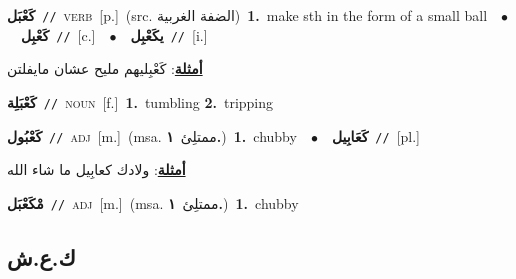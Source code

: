 \documentclass[10pt,a4paper,twoside]{article} %
\begin{document}
\begin{multicols}{2}
{\setlength\topsep{0pt}\textbf{\foreignlanguage{arabic}{كَعْبَل}}\ {\color{gray}\texttt{//}\color{black}}\ \textsc{verb}\ [p.]\ (src. \color{gray}\foreignlanguage{arabic}{الضفة الغربية}\color{black})\ \textbf{1.}~make sth in the form of a small ball\ \ $\bullet$\ \ \setlength\topsep{0pt}\textbf{\foreignlanguage{arabic}{كَعْبِل}}\ {\color{gray}\texttt{//}\color{black}}\ [c.]\ \ $\bullet$\ \ \setlength\topsep{0pt}\textbf{\foreignlanguage{arabic}{يكَعْبِل}}\ {\color{gray}\texttt{//}\color{black}}\ [i.]\  \begin{flushright}\color{gray}\foreignlanguage{arabic}{\textbf{\underline{\foreignlanguage{arabic}{أمثلة}}}: كَعْبِليهم مليح عشان مايفلتن}\end{flushright}\color{black}} \vspace{2mm}

{\setlength\topsep{0pt}\textbf{\foreignlanguage{arabic}{كَعْبَلِة}}\ {\color{gray}\texttt{//}\color{black}}\ \textsc{noun}\ [f.]\ \textbf{1.}~tumbling  \textbf{2.}~tripping\ } \vspace{2mm}

{\setlength\topsep{0pt}\textbf{\foreignlanguage{arabic}{كَعْبُول}}\ {\color{gray}\texttt{//}\color{black}}\ \textsc{adj}\ [m.]\ \color{gray}(msa. \foreignlanguage{arabic}{ممتلِئ}~\foreignlanguage{arabic}{\textbf{١.}})\color{black}\ \textbf{1.}~chubby\ \ $\bullet$\ \ \setlength\topsep{0pt}\textbf{\foreignlanguage{arabic}{كَعَابِيل}}\ {\color{gray}\texttt{//}\color{black}}\ [pl.]\  \begin{flushright}\color{gray}\foreignlanguage{arabic}{\textbf{\underline{\foreignlanguage{arabic}{أمثلة}}}: ولادك كعابِيل ما شاء الله}\end{flushright}\color{black}} \vspace{2mm}

{\setlength\topsep{0pt}\textbf{\foreignlanguage{arabic}{مْكَعْبَل}}\ {\color{gray}\texttt{//}\color{black}}\ \textsc{adj}\ [m.]\ \color{gray}(msa. \foreignlanguage{arabic}{ممتلِئ}~\foreignlanguage{arabic}{\textbf{١.}})\color{black}\ \textbf{1.}~chubby\ } \vspace{2mm}

\vspace{-3mm}
\subsection*{\color{blue}\foreignlanguage{arabic}{ك.ع.ش}\color{blue}{}} 


\end{multicols}
\end{document}
